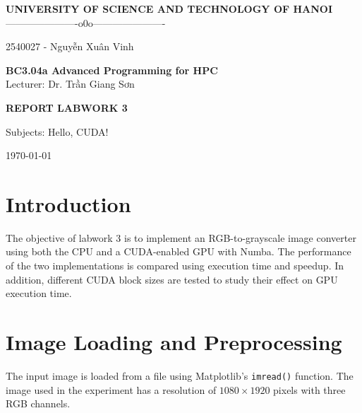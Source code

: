 \documentclass[11pt]{article}
\begin{document}
\begin{center}

{\Large \textbf{UNIVERSITY OF SCIENCE AND TECHNOLOGY OF HANOI}}\\
\vspace{0.3cm}
----------------------o0o----------------------\\

\vspace{4cm}

{\large
\centerline{2540027 - Nguyễn Xuân Vinh}
}

\vspace{4cm}

{\Huge \textbf{BC3.04a Advanced Programming for HPC}}\\
\vspace{0.5cm}
Lecturer: Dr. Trần Giang Sơn

\vspace{4cm}

{\Large \textbf{REPORT LABWORK 3}}\\

\vspace{0.5cm}

{\large
Subjects: Hello, CUDA!
}

\vspace{4cm}
\today
\end{center}

\newpage

\newpage

\tableofcontents

\newpage

\section{Introduction}

The objective of labwork 3 is to implement an RGB-to-grayscale image converter using both the CPU and a CUDA-enabled GPU with Numba. The performance of the two implementations is compared using execution time and speedup. In addition, different CUDA block sizes are tested to study their effect on GPU execution time.

\section{Image Loading and Preprocessing}

The input image is loaded from a file using Matplotlib's \texttt{imread()} function. The image used in the experiment has a resolution of $1080 \times 1920$ pixels with three RGB channels.
\end{document}
